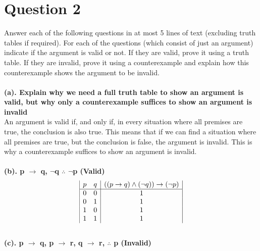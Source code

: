 \documentclass[a4paper]{article}
\begin{document}
\section{Question 2}
Answer each of the following questions in at most 5 lines of text (excluding truth tables if required). For
each of the questions (which consist of just an argument) indicate if the argument is valid or not. If they
are valid, prove it using a truth table. If they are invalid, prove it using a counterexample and explain
how this counterexample shows the argument to be invalid.
\\\\
\textbf{(a). Explain why we need a full truth table to show an argument is valid, but why only a
    counterexample suffices to show an argument is invalid}\\
An argument is valid if, and only if, in every situation where all premises are true, the conclusion is also true. This means that if we can find a situation where all premises are true, but the conclusion is false, the argument is invalid. This is why a counterexample suffices to show an argument is invalid.
\\\\
\textbf{(b). p $\rightarrow $ q, $\neg $q $\therefore $ $\neg $p (Valid)}\\
\begin{displaymath}
    \begin{array}{|c c|c|}
        p & q & ((p \rightarrow q) \wedge (\neg q)) \rightarrow (\neg p) \\
        \hline
        0 & 0 & 1                                                        \\
        0 & 1 & 1                                                        \\
        1 & 0 & 1                                                        \\
        1 & 1 & 1                                                        \\
    \end{array}
\end{displaymath}
\ \\
\textbf{(c). p $\rightarrow $ q, p $\rightarrow $ r, q $\rightarrow $ r, $\therefore $ p (Invalid)}\\
\end{document}
